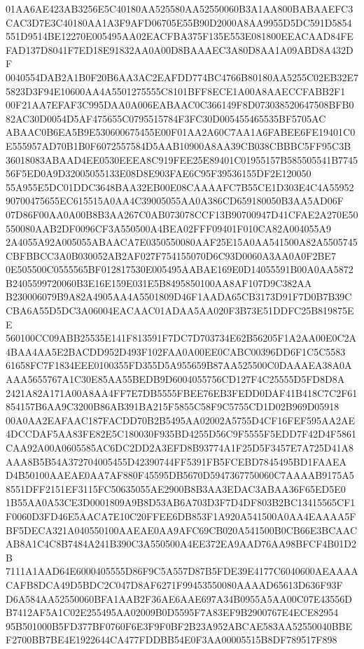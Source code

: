 \documentclass[UTF8,fontset=fandol,zihao=-4,a4paper]{ctexart}
\begin{document}
{{01AA6AE423AB3256E5C40180AA525580AA52550060B3A1AA800BABAAEFC3CAC3D7E3C40180AA1A3F9AFD06705E55B90D2000A8AA9955D5DC591D5854
551D9514BE12270E005495AA02EACFBA375F135E553E081800EEACAAD84FEFAD137D8041F7ED18E91832AA0A00D8BAAAEC3A80D8AA1A09ABD8A432DF
0040554DAB2A1B0F20B6AA3AC2EAFDD774BC4766B80180AA5255C02EB32E75823D3F94E10600AA4A5501275555C8101BFF8ECE1A00A8AAECCFABB2F1
00F21AA7EFAF3C995DAA0A006EABAAC0C366149F8D073038520647508BFB082AC30D0054D5AF475655C0795515784F3FC30D005455465535BF5705AC
ABAAC0B6EA5B9E530600675455E00F01AA2A60C7AA1A6FABEE6FE19401C0E555957AD70B1B0F6072557584D5AAB10900A8AA39CB038CBBBC5FF95C3B
36018083ABAAD4EE0530EEEA8C919FEE25E89401C01955157B585505541B774556F5ED0A9D32005055133E08D8E903FAE6C95F39536155DF2E120050
55A955E5DC01DDC3648BAA32EB00E08CAAAAFC7B55CE1D303E4C4A5595290700475655EC615515A0AA4C39005055AA0A386CD659180050B3AA5AD06F
07D86F00AA0A00B8B3AA267C0AB073078CCF13B90700947D41CFAE2A270E50550080AAB2DF0096CF3A550500A4BEA02FFF09401F010CA82A004055A9
2A4055A92A005055ABAACA7E0350550080AAF25E15A0AA541500A82A5505745CBFBBCC3A0B030052AB2AF027F754155070D6C93D0060A3AA0A0F2BE7
0E505500C0555565BF012817530E005495AABAE169E0D14055591B00A0AA5872B2405599720060B3E16E159E031E5B8495850100AA8AF107D9C382AA
B230006079B9A82A4905AA4A5501809D46F1AADA65CB3173D91F7D0B7B39CCBA6A55D5DC3A06004EACAAC01ADAA5AA020F3B73E51DDFC25B819875EE
560100CC09ABB25535E141F813591F7DC7D703734E62B56205F1A2AA00E0C2A4BAA4AA5E2BACDD952D493F102FAA0A00EE0CABC00396DD6F1C5C5583
61658FC7F1834EEE0100355FD355D5A955659B87AA525500C0DAAAEA38A0AAAA5655767A1C30E85AA55BEDB9D6004055756CD127F4C25555D5FD8D8A
2421A82A171A00A8AA4FF7E7DB5555FBEE76EB3FEDD0DAF41B418C7C2F61854157B6AA9C3200B86AB391BA215F5855C58F9C5755CD1D02B969D05918
00A0AA2EAFAAC187FACDD70B2B5495AA02002A5755D4CF16FEF595AA2AE4DCCDAF5AA83FE82E5C180030F935BD4255D56C9F5555F5EDD7F42D4F5861
CAA92A00A0605585AC6DC2DD2A3EFD8B93774A1F25D5F3457E7A725D41A8AAA8B5B54A372704005455D42390744FF5391FB5FCEBD7845495BD1FAAEA
D4B50100AAEAE0AA7AF880F45595DB5670D5947367750060C7AAAAB9175A58551DFF2151EF3115FC50635055AE2900B8B3AA3EDAC3ABAA36F65ED5E0
1B55AA0A53CE3D0001809A9B8D53AB6A703D3F7D4DF803B2BC13415565CF1F0060D3FD46E5AACA7E10C20FFEE6DB853F1A920A541500A0AA4EAAAA5F
BF5DECA321A040550100AAEAE0AA9AFC69CB020A541500B0CB66E3BCAACAB8A1C4C8B7484A241B390C3A550500A4EE372EA9AAD76AA98BFCF4B01D2B
7111A1AAD64E6000405555D86F9C5A557D87B5FDE39E4177C6040600AEAAAACAFB8DCA49D5BDC2C047D8AF6271F99453550080AAAAD65613D636F93F
D6A584AA52550060BFA1AAB2F36AE6AAE697A34B0955A5AA00C07E43556DB7412AF5A1C02E255495AA02009B0D5595F7A83EF9B2900767E4ECE82954
95B501000B5FD377BF0760F6E3F9F0BF2B23A952ABCAE583AA52550040BBEF2700BB7BE4E1922644CA477FDDBB54E0F3AA00005515B8DF789517F898
}}
\end{document}

